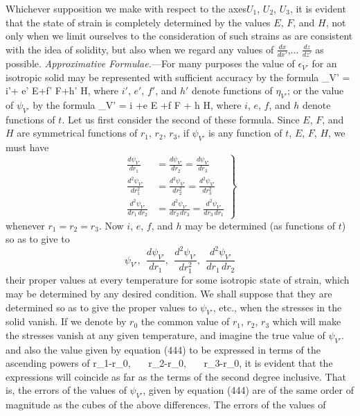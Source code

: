 \documentclass[12pt]{memoir}
\begin{document}
{Whichever supposition we make with respect to the axes$U_1$, $U_2$, $U_3$, it is evident that the state of strain is completely determined by the values $E$, $F$, and $H$, not only when we limit ourselves to the consideration of such strains as are consistent with the idea of solidity, but also when we regard any values of $\frac{dx}{dx'}$,... $\frac{dz}{dz'}$ as possible.
\textit{Approximative Formulae.}---For many purposes the value of $\epsilon_{V'}$ for an isotropic solid may be represented with sufficient accuracy by the formula
\eqs \epsilon_{V'} = i'+ e' E+f' F+h' H,   \label{443}\eqe
where $i'$, $e'$, $f'$, and $h'$ denote functions of $\eta_{V'}$; or the value of $\psi_{V'}$ by the formula
\eqs \psi_{V'} = i +e E +f F + h H,       \label{444}\eqe
where $i$, $e$, $f$, and $h$ denote functions of $t$. Let us first consider the second of these formula. Since $E$, $F$, and $H$ are symmetrical functions of $r_1$, $r_2$, $r_3$, if $\psi_{V'}$ is any function of $t$, $E$, $F$, $H$, we must have
\begin{equation} \left. \begin{aligned}
\frac{d\psi_{V'}}{dr_1}&=\frac{d\psi_{V'}}{dr_2}=\frac{d\psi_{V'}}{dr_3} \\
\frac{d^2\psi_{V'}}{dr_1^2}&=\frac{d^2\psi_{V'}}{dr_2^2}=\frac{d^2\psi_{V'}}{dr_3^2} \\
\frac{d^2\psi_{V'}}{dr_1 \, dr_2}&=\frac{d^2\psi_{V'}}{dr_2\, dr_3}=\frac{d^2\psi_{V'}}{dr_3\,dr_1} \end{aligned}\right\}\label{445}\end{equation}
whenever $r_1=r_2=r_3$.   Now $i$, $e$, $f$, and $h$ may be determined (as functions of $t$) so as to give to
$$\psi_{V'},\ \ \frac{d\psi_{V'}}{dr_1}, \ \ \frac{d^2\psi_{V'}}{dr_1^2}, \ \ \frac{d^2\psi_{V'}}{dr_1 \, dr_2}$$
their proper values at every temperature for some isotropic state of strain, which may be determined by any desired condition. We shall suppose that they are determined so as to give the proper values to $\psi_{V'}$, etc., when the stresses in the solid vanish.  If we denote by $r_0$ the common value of $r_1$, $r_2$, $r_3$ which will make the stresses vanish at any given temperature, and imagine the true value of $\psi_{V'}$. and also the value given by equation (444) to be expressed in terms of the ascending powers of
\eqs r_1-r_0, \ \ \   r_2-r_0, \ \ \ r_3-r_0,   \label{446}\eqe
it is evident that the expressions will coincide as far as the terms of the second degree inclusive. That is, the errors of the values of $\psi_{V'}$, given by equation (444) are of the same order of magnitude as the cubes of the above differences. The errors of the values of
}
\end{document}
